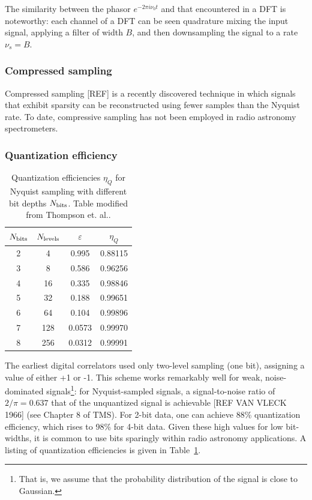\documentclass{ws-rv961x669}
\begin{document}
The similarity between the phasor $e^{-2\pi i \nu_0 t}$ and that encountered in a DFT is noteworthy: each channel of a DFT can be seen quadrature mixing the input signal, applying a filter of width $B$, and then downsampling the signal to a rate $\nu_s=B$.

\subsubsection{Compressed sampling}
Compressed sampling [REF] is a recently discovered technique in which signals that exhibit sparsity can be reconstructed using fewer samples than the Nyquist rate. To date, compressive sampling has not been employed in radio astronomy spectrometers.

\subsubsection{Quantization efficiency \label{sub:quant}}

\begin{table}
	\caption{Quantization efficiencies $\eta_Q$ for Nyquist sampling with different bit depths $N_{\rm{bits}}$. Table modified from Thompson et. al.\citep{Thompson:2007p8886}.\label{tab:quant_eff}}
	\begin{center}
	\begin{tabular}{c c c c}
	\hline
	$N_{\rm{bits}}$ & $N_{\rm{levels}}$ & $\varepsilon$ & $\eta_Q$ \\
	\hline
	\hline
	2 & 4   & 0.995  & 0.88115 \\
	3 & 8   & 0.586  & 0.96256 \\
	4 & 16  & 0.335  & 0.98846 \\
	5 & 32  & 0.188  & 0.99651 \\
	6 & 64  & 0.104  & 0.99896 \\
	7 & 128 & 0.0573 & 0.99970 \\
	8 & 256 & 0.0312 & 0.99991 \\
	\hline
	\end{tabular}
	\end{center}
\end{table}

The earliest digital correlators \citep{Weinreb:1963p10042} used only two-level sampling (one bit), assigning a value of either +1 or -1. This scheme works remarkably well for weak, noise-dominated signals\footnote{That is, we assume that the probability distribution of the signal is close to Gaussian.}: for Nyquist-sampled signals, a signal-to-noise ratio of $2/\pi=0.637$ that of the unquantized signal is achievable [REF VAN VLECK 1966] (see Chapter 8 of TMS\citet{ThompsonMoranSwenson2004}). For 2-bit data, one can achieve 88\% quantization efficiency, which rises to 98\% for 4-bit data. Given these high values for low bit-widths, it is common to use bits sparingly within radio astronomy applications. A listing of quantization efficiencies\cite{Thompson:2007p8886} is given in Table~\ref{tab:quant_eff}.
\end{document}

